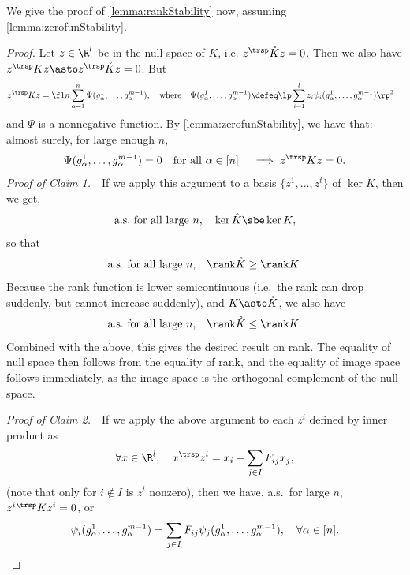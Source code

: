 \documentclass[main.tex]{subfiles}
\begin{document}
We give the proof of \cref{lemma:rankStability} now, assuming \cref{lemma:zerofunStability}.
\begin{proof}
  \newcommand{\myvv}{z}
Let $\myvv \in \R^l$ be in the null space of $\mathring K$, i.e. $\myvv^\trsp \mathring K \myvv = 0$.
Then we also have $\myvv^\trsp K \myvv \asto \myvv^\trsp \mathring K \myvv = 0$.
But
\begin{align*}
\myvv^\trsp K \myvv
    &=
        \f 1 n \sum_{\alpha=1}^n \Psi(g^1_\alpha, \ldots, g^{\MM-1}_\alpha)
        ,
        \quad
        \text{where}
        \quad
        \Psi(g^1_\alpha, \ldots, g^{\MM-1}_\alpha) \defeq
        \lp
            \sum_{i=1}^l \myvv_i \psi_i(g^1_\alpha, \ldots, g^{\MM-1}_\alpha)
        \rp^2
\end{align*}
and $\Psi$ is a nonnegative function.
By \cref{lemma:zerofunStability}, we have that: almost surely, for large enough $n$, 
\[\Psi(g^1_\alpha, \ldots, g^{\MM-1}_\alpha) = 0 \quad \text{for all $\alpha \in [n]$}
\quad
\implies \myvv^\trsp K \myvv = 0.\]
\textit{Proof of Claim 1.}\ \ 
If we apply this argument to a basis $\{\myvv^1, \ldots, \myvv^t\}$ of $\ker \mathring K$, then we get, 
\[\text{a.s.\ for all large $n$,}\quad 
\ker \mathring K \sbe \ker K,\]
so that
\[\text{a.s.\ for all large $n$,}\quad 
\rank \mathring K \ge \rank K.\]
Because the rank function is lower semicontinuous (i.e.\ the rank can drop suddenly, but cannot increase suddenly), and $K \asto \mathring K$, we also have
\[\text{a.s.\ for all large $n$,}\quad 
\rank \mathring K \le \rank K.\]
Combined with the above, this gives the desired result on rank.
The equality of null space then follows from the equality of rank, and the equality of image space follows immediately, as the image space is the orthogonal complement of the null space.

\textit{Proof of Claim 2.}\ \ 
If we apply the above argument to each $\myvv^i$ defined by inner product as
\[\forall x \in \R^l,\quad x^\trsp \myvv^i = x_i - \sum_{j \in I} F_{ij} x_j,
\]
(note that only for $i \not \in I$ is $\myvv^i$ nonzero),
then we have, a.s.\ for large $n$, $\myvv^i{}^\trsp K \myvv^i = 0$, or
\begin{equation*}
    \psi_i(g^1_\alpha, \ldots, g^{m-1}_\alpha)
    = \sum_{j \in I} F_{ij} \psi_j(g^1_\alpha, \ldots, g^{m-1}_\alpha),
    \quad \forall \alpha \in [n].
\end{equation*}
\end{proof}
\end{document}
